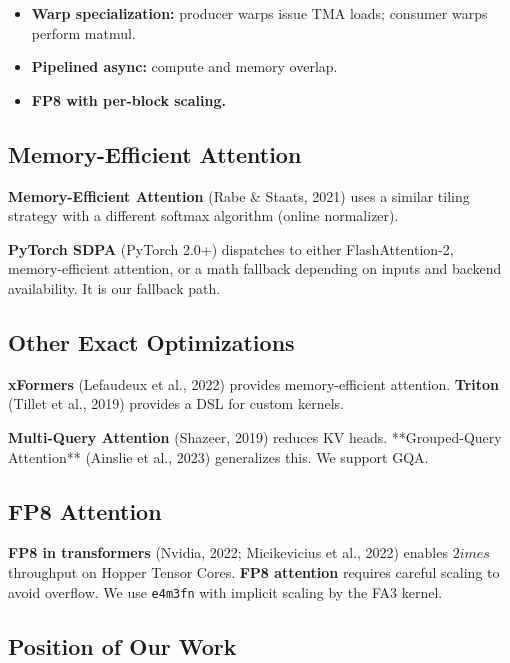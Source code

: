 \begin{itemize}
\item \textbf{Warp specialization:} producer warps issue TMA loads; consumer warps
  perform matmul.
\item \textbf{Pipelined async:} compute and memory overlap.
\item \textbf{FP8 with per-block scaling.}

\end{itemize}
\subsection{Memory-Efficient Attention}

\textbf{Memory-Efficient Attention} (Rabe \& Staats, 2021) uses a similar tiling 
strategy with a different softmax algorithm (online normalizer).

\textbf{PyTorch SDPA} (PyTorch 2.0+) dispatches to either FlashAttention-2, 
memory-efficient attention, or a math fallback depending on inputs and 
backend availability. It is our fallback path.

\subsection{Other Exact Optimizations}

\textbf{xFormers} (Lefaudeux et al., 2022) provides memory-efficient attention. 
\textbf{Triton} (Tillet et al., 2019) provides a DSL for custom kernels.

\textbf{Multi-Query Attention} (Shazeer, 2019) reduces KV heads. **Grouped-Query 
Attention** (Ainslie et al., 2023) generalizes this. We support GQA.

\subsection{FP8 Attention}

\textbf{FP8 in transformers} (Nvidia, 2022; Micikevicius et al., 2022) enables 
$2	imes$ throughput on Hopper Tensor Cores. \textbf{FP8 attention} requires 
careful scaling to avoid overflow. We use \texttt{e4m3fn} with implicit scaling 
by the FA3 kernel.

\subsection{Position of Our Work}

